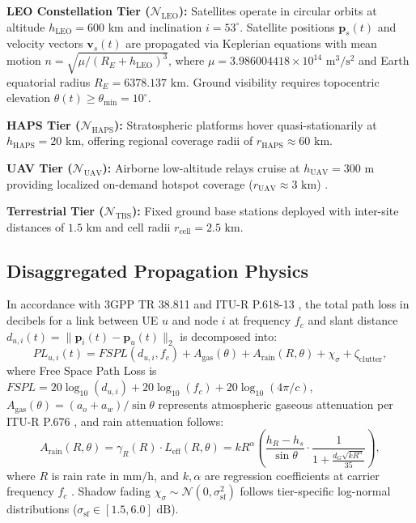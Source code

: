 \documentclass[conference]{IEEEtran}
\begin{document}
\textbf{LEO Constellation Tier ($\mathcal{N}_{\text{LEO}}$):} Satellites operate in circular orbits at altitude $h_{\text{LEO}} = 600\text{ km}$ and inclination $i = 53^\circ$. Satellite positions $\mathbf{p}_s(t)$ and velocity vectors $\mathbf{v}_s(t)$ are propagated via Keplerian equations with mean motion $n = \sqrt{\mu / (R_E + h_{\text{LEO}})^3}$, where $\mu = 3.986004418 \times 10^{14}\text{ m}^3/\text{s}^2$ and Earth equatorial radius $R_E = 6378.137\text{ km}$. Ground visibility requires topocentric elevation $\theta(t) \ge \theta_{\text{min}} = 10^\circ$.

\textbf{HAPS Tier ($\mathcal{N}_{\text{HAPS}}$):} Stratospheric platforms hover quasi-stationarily at $h_{\text{HAPS}} = 20\text{ km}$, offering regional coverage radii of $r_{\text{HAPS}} \approx 60\text{ km}$.

\textbf{UAV Tier ($\mathcal{N}_{\text{UAV}}$):} Airborne low-altitude relays cruise at $h_{\text{UAV}} = 300\text{ m}$ providing localized on-demand hotspot coverage ($r_{\text{UAV}} \approx 3\text{ km}$) \cite{alhourani2014optimal}.

\textbf{Terrestrial Tier ($\mathcal{N}_{\text{TBS}}$):} Fixed ground base stations deployed with inter-site distances of $1.5\text{ km}$ and cell radii $r_{\text{cell}} = 2.5\text{ km}$.

\subsection{Disaggregated Propagation Physics}
In accordance with 3GPP TR 38.811 \cite{3gpp_tr38811} and ITU-R P.618-13 \cite{itur_p618}, the total path loss in decibels for a link between UE $u$ and node $i$ at frequency $f_c$ and slant distance $d_{u,i}(t) = \|\mathbf{p}_i(t) - \mathbf{p}_u(t)\|_2$ is decomposed into:
\begin{equation}
PL_{u,i}(t) = FSPL(d_{u,i}, f_c) + A_{\text{gas}}(\theta) + A_{\text{rain}}(R, \theta) + \chi_{\sigma} + \zeta_{\text{clutter}},
\end{equation}
where Free Space Path Loss is $FSPL = 20\log_{10}(d_{u,i}) + 20\log_{10}(f_c) + 20\log_{10}(4\pi / c)$, $A_{\text{gas}}(\theta) = (a_o + a_w)/\sin\theta$ represents atmospheric gaseous attenuation per ITU-R P.676 \cite{itur_p676}, and rain attenuation follows:
\begin{equation}
A_{\text{rain}}(R, \theta) = \gamma_R(R) \cdot L_{\text{eff}}(R, \theta) = k R^{\alpha} \left( \frac{h_R - h_s}{\sin\theta} \cdot \frac{1}{1 + \frac{d_G \sqrt{k R^\alpha}}{35}} \right),
\end{equation}
where $R$ is rain rate in $\text{mm/h}$, and $k, \alpha$ are regression coefficients at carrier frequency $f_c$ \cite{itur_p618}. Shadow fading $\chi_\sigma \sim \mathcal{N}(0, \sigma_{\text{sf}}^2)$ follows tier-specific log-normal distributions ($\sigma_{\text{sf}} \in [1.5, 6.0]\text{ dB}$).
\end{document}
